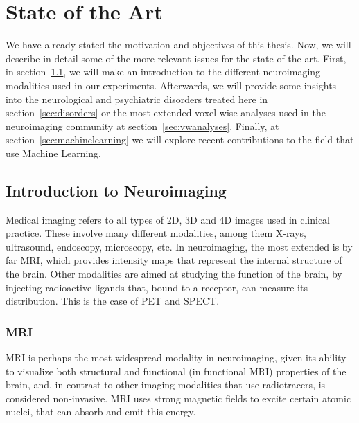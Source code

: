 \chapter{State of the Art}\label{ch:stateofart}
We have already stated the motivation and objectives of this thesis. Now, we will describe in detail some of the more relevant issues for the state of the art. First, in section~\ref{sec:neuroimaging}, we will make an introduction to the different neuroimaging modalities used in our experiments. Afterwards, we will provide some insights into the neurological and psychiatric disorders treated here in section~\ref{sec:disorders} or the most extended voxel-wise analyses used in the neuroimaging community at section~\ref{sec:vwanalyses}. Finally, at section~\ref{sec:machinelearning} we will explore recent contributions to the field that use Machine Learning. 

\section{Introduction to Neuroimaging}\label{sec:neuroimaging}
Medical imaging refers to all types of 2D, 3D and 4D images used in clinical practice. These involve many different modalities, among them X-rays, ultrasound, endoscopy, microscopy, etc. In neuroimaging, the most extended is by far \ac{MRI}, which provides intensity maps that represent the internal structure of the brain. Other modalities are aimed at studying the function of the brain, by injecting radioactive ligands that, bound to a receptor, can measure its distribution. This is the case of \ac{PET} and \ac{SPECT}.

\subsection{\acf{MRI}}
\acf{MRI} is perhaps the most widespread modality in neuroimaging, given its ability to visualize both structural and functional (in functional \ac{MRI}) properties of the brain, and, in contrast to other imaging modalities that use radiotracers, is considered non-invasive. \ac{MRI} uses strong magnetic fields to excite certain atomic nuclei, that can absorb and emit this energy. 

